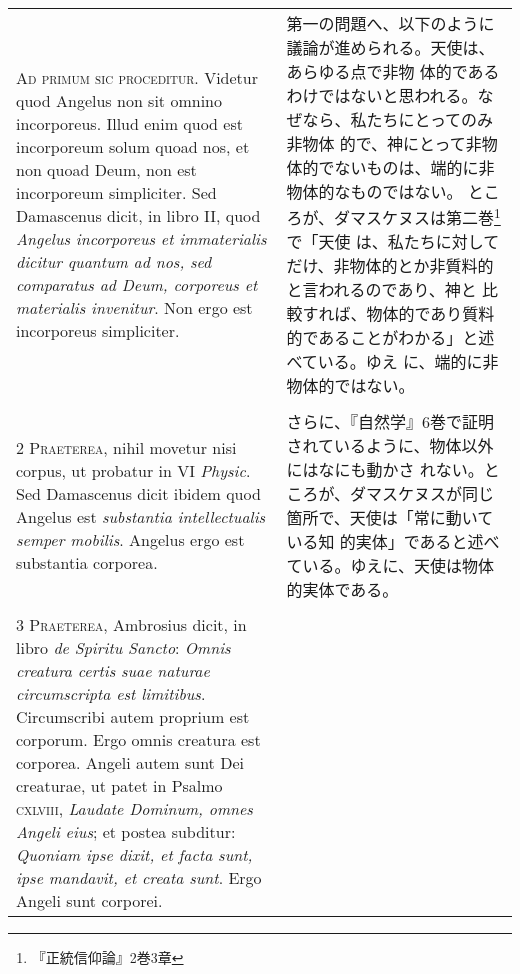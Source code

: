 \documentclass[10pt]{jsarticle} %
\begin{document}
\begin{longtable}{p{21em}p{21em}}


{\huge A}{\scshape d primum sic proceditur}. Videtur quod Angelus non
sit omnino incorporeus. Illud enim quod est incorporeum solum quoad nos,
et non quoad Deum, non est incorporeum simpliciter. Sed Damascenus
dicit, in libro II, quod {\itshape Angelus incorporeus et immaterialis
dicitur quantum ad nos, sed comparatus ad Deum, corporeus et materialis
invenitur}. Non ergo est incorporeus simpliciter.

&

 第一の問題へ、以下のように議論が進められる。天使は、あらゆる点で非物
 体的であるわけではないと思われる。なぜなら、私たちにとってのみ非物体
 的で、神にとって非物体的でないものは、端的に非物体的なものではない。
 ところが、ダマスケヌスは第二巻\footnote{『正統信仰論』2巻3章}で「天使
 は、私たちに対してだけ、非物体的とか非質料的と言われるのであり、神と
 比較すれば、物体的であり質料的であることがわかる」と述べている。ゆえ
 に、端的に非物体的ではない。

\\\\


{\scshape 2 Praeterea}, nihil movetur nisi corpus, ut probatur in VI
{\itshape Physic}. Sed Damascenus dicit ibidem quod Angelus est
{\itshape substantia intellectualis semper mobilis}. Angelus ergo est
substantia corporea.


&

 さらに、『自然学』6巻で証明されているように、物体以外にはなにも動かさ
 れない。ところが、ダマスケヌスが同じ箇所で、天使は「常に動いている知
 的実体」であると述べている。ゆえに、天使は物体的実体である。

\\\\


{\scshape 3 Praeterea}, Ambrosius dicit, in libro {\itshape de Spiritu
Sancto}: {\itshape Omnis creatura certis suae naturae circumscripta
est limitibus}. Circumscribi autem proprium est corporum. Ergo omnis
creatura est corporea. Angeli autem sunt Dei creaturae, ut patet in
Psalmo {\scshape cxlviii}, {\itshape Laudate Dominum, omnes Angeli
eius}; et postea subditur: {\itshape Quoniam ipse dixit, et facta
sunt, ipse mandavit, et creata sunt}. Ergo Angeli sunt corporei.


&


\end{longtable}
\end{document}
